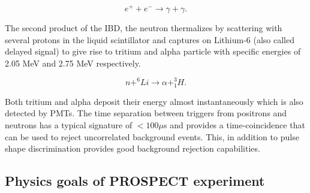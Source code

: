\documentclass[11pt]{article}
\numberwithin{equation}{section}
\begin{document}
\begin{equation}
e^{+} + e^{-} \rightarrow \gamma + \gamma .
\end{equation} 

The second product of the IBD,  the neutron thermalizes by scattering with several protons in the liquid scintillator and captures on Lithium-6 (also called delayed signal) to give rise to tritium and alpha particle with specific energies of 2.05 MeV and 2.75 MeV respectively. 

\begin{equation}
\label{eq:licapture}
n + ^6 Li \rightarrow \alpha + _1^3 H .
\end{equation} 

Both tritium  and alpha deposit their energy almost instantaneously which is also detected by PMTs. The time separation between triggers from positrons and neutrons has a typical signature of $ < 100 \mu$s and provides a time-coincidence that can be used to reject uncorrelated background events. This, in addition to pulse shape discrimination provides good background rejection capabilities.

\subsection[Physics goals]{Physics goals of PROSPECT experiment}
\end{document}
